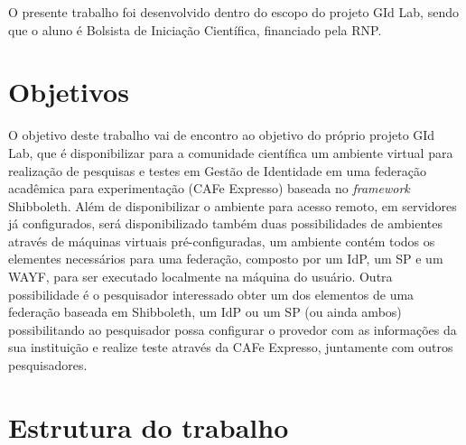 O presente trabalho foi desenvolvido dentro do escopo do projeto \ac{GId Lab}, sendo que o aluno é Bolsista de Iniciação Científica, financiado pela RNP.

\section{Objetivos}
\label{ci_s_objetivos}

O objetivo deste trabalho vai de encontro ao objetivo do próprio projeto GId Lab, que é disponibilizar para a comunidade científica um ambiente virtual para realização de pesquisas e testes em Gestão de Identidade em uma federação acadêmica para experimentação (CAFe Expresso) baseada no \textit{framework} Shibboleth. Além de disponibilizar o ambiente para acesso remoto, em servidores já configurados, será disponibilizado também duas possibilidades de ambientes através de máquinas virtuais pré-configuradas, um ambiente contém todos os elementes necessários para uma federação, composto por um IdP, um SP e um WAYF, para ser executado localmente na máquina do usuário. Outra possibilidade é o pesquisador interessado obter um dos elementos de uma federação baseada em Shibboleth, um IdP ou um SP (ou ainda ambos) possibilitando ao pesquisador possa configurar o provedor com as informações da sua instituição e realize teste através da CAFe Expresso, juntamente com outros pesquisadores.

\section{Estrutura do trabalho}
\label{ci_s_estrutura}

